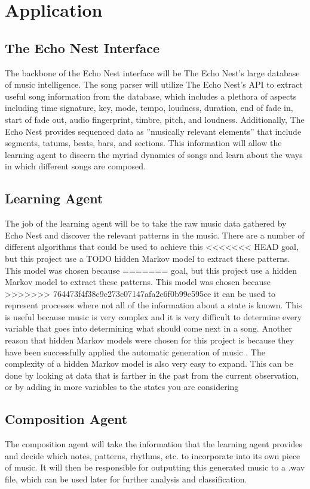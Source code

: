 \documentclass{article}
\begin{document}
\section{Application}
\subsection{The Echo Nest Interface}
The backbone of the Echo Nest interface will be The Echo Nest’s large database of music intelligence. The
song parser will utilize The Echo Nest’s API to extract useful song information from the database, which
includes a plethora of aspects including time signature, key, mode, tempo, loudness, duration, end of fade
in, start of fade out, audio fingerprint, timbre, pitch, and loudness. Additionally, The Echo Nest provides
sequenced data as ”musically relevant elements” that include segments, tatums, beats, bars, and sections.
This information will allow the learning agent to discern the myriad dynamics of songs and learn about the
ways in which different songs are composed.

\subsection{Learning Agent}
The job of the learning agent will be to take the raw music data gathered by Echo Nest and discover the
relevant patterns in the music. There are a number of different algorithms that could be used to achieve this
<<<<<<< HEAD
goal, but this project use a \Large{TODO} hidden Markov model to extract these patterns. This model was chosen because
=======
goal, but this project use a hidden Markov model to extract these patterns. This model was chosen because
>>>>>>> 764473f4f38c9c273c07147afa2c6f0b99e595ce
it can be used to represent processes where not all of the information about a state is known. This is useful
because music is very complex and it is very difficult to determine every variable that goes into determining
what should come next in a song. Another reason that hidden Markov models were chosen for this project
is because they have been successfully applied the automatic generation of music \cite{5492670}.
The complexity of a hidden Markov model is also very easy to expand. This can be done by looking at data that is farther in
the past from the current observation, or by adding in more variables to the states you are considering

\subsection{Composition Agent}
The composition agent will take the information that the learning agent provides and decide which notes,
patterns, rhythms, etc. to incorporate into its own piece of music. It will then be responsible for outputting
this generated music to a .wav file, which can be used later for further analysis and classification.
\end{document}
